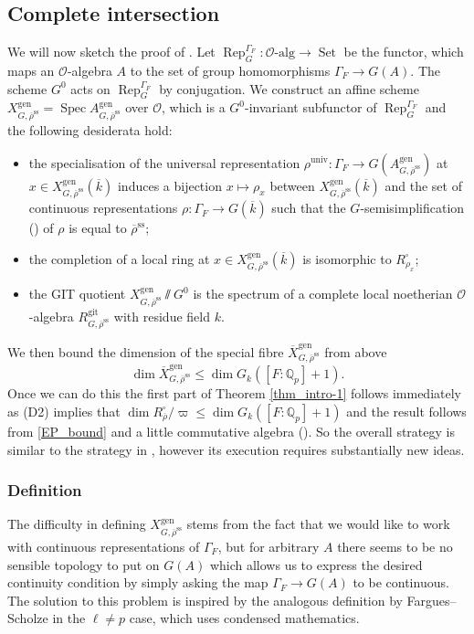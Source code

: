 \documentclass{amsart}
\theoremstyle{definition}
\theoremstyle{remark}
\DeclareMathOperator{\Spec}{Spec}
\DeclareMathOperator{\Rep}{Rep}
\DeclareMathOperator{\Set}{Set}
\newcommand{\Qp}{\mathbb {Q}_p}
\newcommand{\OO}{\mathcal O}
\newcommand{\alg}{\mathrm{alg}}
\newcommand{\rhobar}{\overline{\rho}}
\newcommand{\gen}{\mathrm{gen}}
\newcommand{\univ}{\mathrm{univ}}
\newcommand{\Xbar}{\overline{X}}
\newcommand{\kbar}{\overline{k}}
\newcommand{\rhobarss}{\rhobar^{\mathrm{ss}}}
\newcommand{\git}{\mathrm{git}}
\begin{document}
\subsection{Complete intersection}\label{sec_ci} We will now sketch the proof of .
Let $\Rep^{\Gamma_F}_G: \OO\text{-}\alg \rightarrow \Set$ be the functor, which maps 
an $\OO$-algebra $A$ to the set of group homomorphisms $\Gamma_F\rightarrow G(A)$.
The scheme $G^0$ acts on $\Rep^{\Gamma_F}_G$ by conjugation. 
We construct an affine scheme $X^{\gen}_{G, \rhobarss}=\Spec A^{\gen}_{G, \rhobarss}$ over $\OO$, 
which is a $G^0$-invariant subfunctor of $\Rep^{\Gamma_F}_G$ and the following desiderata hold:
\begin{itemize} 
\item[(D1)] the specialisation of the universal representation $\rho^{\univ}: \Gamma_F \rightarrow G(A^{\gen}_{G, \rhobarss})$
at $x\in X^{\gen}_{G, \rhobarss}(\kbar)$ induces a bijection $x\mapsto \rho_x$ between 
$X^{\gen}_{G, \rhobarss}(\kbar)$ and the set of continuous representations
$\rho: \Gamma_F \rightarrow G(\kbar)$ such that the $G$-semisimplification () of $\rho$ is equal 
to $\rhobarss$;
\item[(D2)] the completion of a local ring at $x\in X^{\gen}_{G, \rhobarss}(\kbar)$ is isomorphic 
to $R^{\square}_{\rho_x}$;
\item[(D3)] the GIT quotient $X^{\gen}_{G, \rhobarss} \sslash G^0$ is the spectrum of  a complete local noetherian 
$\OO$-algebra $R^{\git}_{G,\rhobarss}$ with residue field $k$.
\end{itemize}
We then bound the dimension of the special fibre $\Xbar^{\gen}_{G, \rhobarss}$ from above 
\begin{equation}\label{intro_bound}
\dim \Xbar^{\gen}_{G, \rhobarss}\le \dim G_k([F:\Qp]+1).
\end{equation}
Once we can do this the first part of Theorem \ref{thm_intro-1} follows immediately
as (D2) implies that $\dim R^{\square}_{\rhobar}/\varpi\le  \dim G_k([F:\Qp]+1)$ and the result 
follows from \eqref{EP_bound} and a little commutative algebra (). 
So the overall strategy is similar to the strategy in \cite{BIP_new}, however its execution 
requires substantially new ideas.

\subsubsection{Definition}\label{subsub_defi} The difficulty in defining $X^{\gen}_{G, \rhobarss}$ stems from the fact that 
we would like to work with continuous representations of $\Gamma_F$, but for 
arbitrary $A$ there seems to be no sensible topology to put on $G(A)$ which allows us to express the desired continuity condition by simply asking the map $\Gamma_F \to G(A)$ to be continuous. The solution to this problem 
is inspired by the analogous definition by Fargues--Scholze \cite{fargues2021geometrization} in the $\ell\neq p$ case, which uses condensed mathematics.
\end{document}
